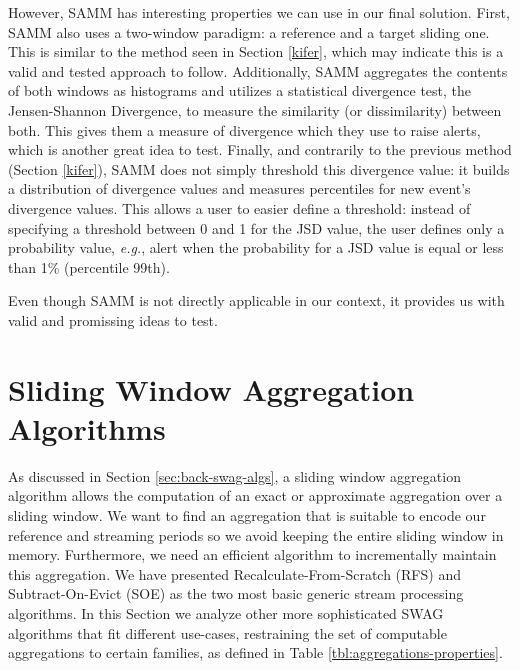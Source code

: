 However, SAMM has interesting properties we can use in our final solution. First, SAMM also uses a two-window paradigm: a reference and a target sliding one. This is similar to the method seen in Section \ref{kifer}, which may indicate this is a valid and tested approach to follow. Additionally, SAMM aggregates the contents of both windows as histograms and utilizes a statistical divergence test, the Jensen-Shannon Divergence, to measure the similarity (or dissimilarity) between both. This gives them a measure of divergence which they use to raise alerts, which is another great idea to test. Finally, and contrarily to the previous method (Section \ref{kifer}), SAMM does not simply threshold this divergence value: it builds a distribution of divergence values and measures percentiles for new event's divergence values. This allows a user to easier define a threshold: instead of specifying a threshold between 0 and 1 for the JSD value, the user defines only a probability value, \textit{e.g.}, alert when the probability for a JSD value is equal or less than 1\% (percentile 99th).

Even though SAMM is not directly applicable in our context, it provides us with valid and promissing ideas to test.


\section{Sliding Window Aggregation Algorithms} \label{sec:sota-swag-algs}

As discussed in Section \ref{sec:back-swag-algs}, a sliding window aggregation algorithm allows the computation of an exact or approximate aggregation over a sliding window. We want to find an aggregation that is suitable to encode our reference and streaming periods so we avoid keeping the entire sliding window in memory. Furthermore, we need an efficient algorithm to incrementally maintain this aggregation. We have presented Recalculate-From-Scratch (RFS) and Subtract-On-Evict (SOE) as the two most basic generic stream processing algorithms. In this Section we analyze other more sophisticated SWAG algorithms that fit different use-cases, restraining the set of computable aggregations to certain families, as defined in Table \ref{tbl:aggregations-properties}.

